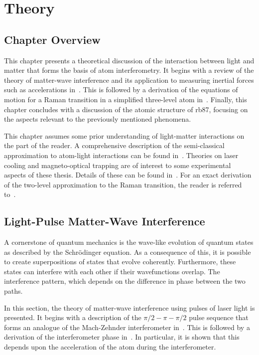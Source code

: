 \chapter{Theory}\label{chap:theory}
\section{Chapter Overview}\label{sec:theory_overview}
This chapter presents a theoretical discussion of the interaction
between light and matter that forms the basis of atom interferometry.
It begins with a review of the theory of matter-wave interference and
its application to measuring inertial forces such as accelerations
in~. This is followed by a derivation of
the equations of motion for a Raman transition in a simplified
three-level atom
in~. Finally, this chapter concludes with
a discussion of the atomic structure of \ac{rb87}, focusing on the
aspects relevant to the previously mentioned phenomena.
\par\noindent
This chapter assumes some prior understanding of light-matter
interactions on the part of the reader. A comprehensive description of
the semi-classical approximation to atom-light interactions can be
found in~\cite{Grynberg2011}. Theories on laser cooling and magneto-optical
trapping are of interest to some experimental aspects of these thesis.
Details of these can be found in~\cite{Metcalf2003}. For an exact derivation of
the two-level approximation to the Raman transition, the reader is referred
to~\cite{Wu1996}.  
\section{Light-Pulse Matter-Wave Interference}\label{sec:theory_atomint}
A cornerstone of quantum mechanics is the wave-like evolution of
quantum states as described by the Schr\"odinger equation. As a
consequence of this, it is possible to create superpositions of states
that evolve coherently. Furthermore, these states can interfere with
each other if their wavefunctions overlap. The interference pattern,
which depends on the difference in phase between the two paths.
\par\noindent
In this section, the theory of matter-wave interference using pulses
of laser light is presented. It begins with a description of the
$\pi/2-\pi-\pi/2$ pulse sequence that forms an analogue of the
Mach-Zehnder interferometer in~. This is
followed by a derivation of the interferometer phase in~. In
particular, it is shown that this depends upon the
acceleration of the atom during the interferometer. 

